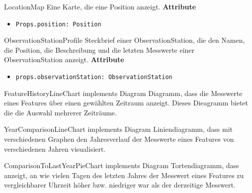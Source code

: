     \begin{Class}{LocationMap}
        Eine Karte, die eine Position anzeigt.
        \textbf{Attribute}
        \begin{itemize}
            \item \texttt{Props.position: Position}
        \end{itemize}
    \end{Class}

    \begin{Class}{ObservationStationProfile}
        Steckbrief einer ObservationStation, die den Namen, die Position, die Beschreibung und die letzten Messwerte einer ObservationStation anzeigt.
        \textbf{Attribute}
        \begin{itemize}
            \item \texttt{props.observationStation: ObservationStation}
        \end{itemize}
    \end{Class}

    \begin{Class}{FeatureHistoryLineChart implements Diagram}
        Diagramm, dass die Messwerte eines Features über einen gewählten Zeitraum anzeigt. Dieses Dieagramm bietet die die Auswahl mehrerer Zeiträume.
    \end{Class}

    \begin{Class}{YearComparisonLineChart implements Diagram}
        Liniendiagramm, dass mit verschiedenen Graphen den Jahresverlauf der Messwerte eines Features von verschiedenen Jahren visualisiert.
    \end{Class}

    \begin{Class}{ComparisonToLastYearPieChart implements Diagram}
        Tortendiagramm, dass anzeigt, an wie vielen Tagen des letzten Jahres der Messwert eines Features zu vergleichbarer Uhrzeit höher bzw. niedriger war als der derzeitige Messwert.
    \end{Class}


